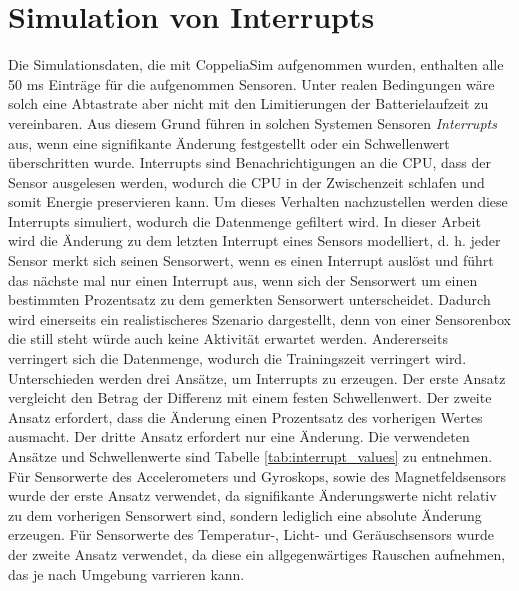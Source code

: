 \section{Simulation von Interrupts}
Die Simulationsdaten, die mit CoppeliaSim aufgenommen wurden, enthalten alle 50 ms Einträge für die aufgenommen Sensoren.
Unter realen Bedingungen wäre solch eine Abtastrate aber nicht mit den Limitierungen der Batterielaufzeit zu vereinbaren.
Aus diesem Grund führen in solchen Systemen Sensoren \textit{Interrupts} aus, wenn eine signifikante Änderung festgestellt oder ein Schwellenwert überschritten wurde.
Interrupts sind Benachrichtigungen an die CPU, dass der Sensor ausgelesen werden, wodurch die CPU in der Zwischenzeit schlafen und somit Energie preservieren kann.
\newline
\newline
Um dieses Verhalten nachzustellen werden diese Interrupts simuliert, wodurch die Datenmenge gefiltert wird.
In dieser Arbeit wird die Änderung zu dem letzten Interrupt eines Sensors modelliert,
d. h. jeder Sensor merkt sich seinen Sensorwert, wenn es einen Interrupt auslöst
und führt das nächste mal nur einen Interrupt aus, wenn sich der Sensorwert um einen bestimmten Prozentsatz zu dem gemerkten Sensorwert unterscheidet.
\newline
\newline
Dadurch wird einerseits ein realistischeres Szenario dargestellt,
denn von einer Sensorenbox die still steht würde auch keine Aktivität erwartet werden.
Andererseits verringert sich die Datenmenge, wodurch die Trainingszeit verringert wird.
\newline
\newline
Unterschieden werden drei Ansätze, um Interrupts zu erzeugen.
Der erste Ansatz vergleicht den Betrag der Differenz mit einem festen Schwellenwert.
Der zweite Ansatz erfordert, dass die Änderung einen Prozentsatz des vorherigen Wertes ausmacht.
Der dritte Ansatz erfordert nur eine Änderung.
\newline
\newline
Die verwendeten Ansätze und Schwellenwerte sind Tabelle \ref{tab:interrupt_values} zu entnehmen.
Für Sensorwerte des Accelerometers und Gyroskops, sowie des Magnetfeldsensors wurde der erste Ansatz verwendet,
da signifikante Änderungswerte nicht relativ zu dem vorherigen Sensorwert sind, sondern lediglich eine absolute Änderung erzeugen.
Für Sensorwerte des Temperatur-, Licht- und Geräuschsensors wurde der zweite Ansatz verwendet,
da diese ein allgegenwärtiges Rauschen aufnehmen, das je nach Umgebung varrieren kann.
